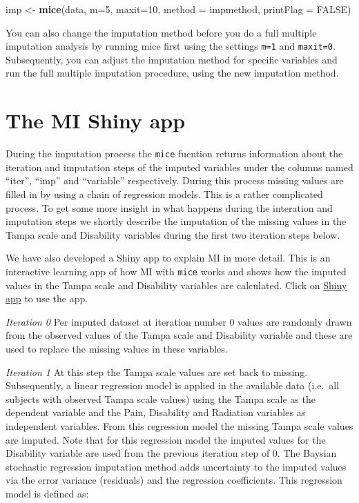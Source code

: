 \documentclass[
]{book}
\newenvironment{Shaded}{\begin{snugshade}}{\end{snugshade}}
\newcommand{\DataTypeTok}[1]{\textcolor[rgb]{0.13,0.29,0.53}{#1}}
\newcommand{\DecValTok}[1]{\textcolor[rgb]{0.00,0.00,0.81}{#1}}
\newcommand{\KeywordTok}[1]{\textcolor[rgb]{0.13,0.29,0.53}{\textbf{#1}}}
\newcommand{\NormalTok}[1]{#1}
\newcommand{\OtherTok}[1]{\textcolor[rgb]{0.56,0.35,0.01}{#1}}
\newcommand{\StringTok}[1]{\textcolor[rgb]{0.31,0.60,0.02}{#1}}
\begin{document}
\begin{Shaded}
\begin{Highlighting}[]
\NormalTok{imp <-}\StringTok{ }\KeywordTok{mice}\NormalTok{(data, }\DataTypeTok{m=}\DecValTok{5}\NormalTok{, }\DataTypeTok{maxit=}\DecValTok{10}\NormalTok{, }\DataTypeTok{method =}\NormalTok{ impmethod,  }\DataTypeTok{printFlag =} \OtherTok{FALSE}\NormalTok{)}
\end{Highlighting}
\end{Shaded}

You can also change the imputation method before you do a full multiple
imputation analysis by running mice first using the settings
\texttt{m=1} and \texttt{maxit=0}. Subsequently, you can adjust the
imputation method for specific variables and run the full multiple
imputation procedure, using the new imputation method.

\hypertarget{the-mi-shiny-app}{%
\section{The MI Shiny app}\label{the-mi-shiny-app}}

During the imputation process the \texttt{mice} fucntion returns
information about the iteration and imputation steps of the imputed
variables under the columns named ``iter'', ``imp'' and ``variable''
respectively. During this process missing values are filled in by using
a chain of regression models. This is a rather complicated process. To
get some more insight in what happens during the interation and
imputation steps we shortly describe the imputation of the missing
values in the Tampa scale and Disability variables during the first two
iteration steps below.

We have also developed a Shiny app to explain MI in more detail. This is
an interactive learning app of how MI with \texttt{mice} works and shows
how the imputed values in the Tampa scale and Disability variables are
calculated. Click on
\href{https://missingdata.shinyapps.io/mi2variables/}{Shiny app} to use
the app.

\emph{Iteration 0} Per imputed dataset at iteration number 0 values are
randomly drawn from the observed values of the Tampa scale and
Disability variable and these are used to replace the missing values in
these variables.

\emph{Iteration 1} At this step the Tampa scale values are set back to
missing. Subsequently, a linear regression model is applied in the
available data (i.e.~all subjects with observed Tampa scale values)
using the Tampa scale as the dependent variable and the Pain, Disability
and Radiation variables as independent variables. From this regression
model the missing Tampa scale values are imputed. Note that for this
regression model the imputed values for the Disability variable are used
from the previous iteration step of 0. The Baysian stochastic regression
imputation method adds uncertainty to the imputed values via the error
variance (residuals) and the regression coefficients. This regression
model is defined as:
\end{document}
